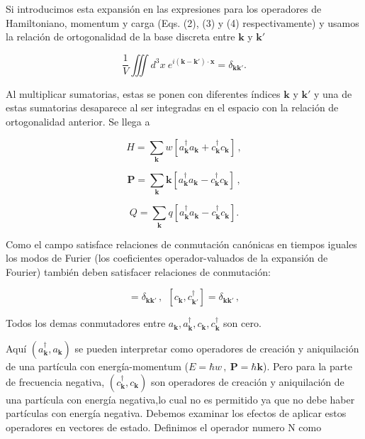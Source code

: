 \documentclass{article}
\begin{document}
Si introducimos esta expansión en las expresiones para los operadores de Hamiltoniano, momentum y carga (Eqs. (2), (3) y (4) respectivamente) y usamos la relación de ortogonalidad de la base discreta entre $\mathbf{k}$ y $\mathbf{k'}$

\begin{equation}
  \frac{1}{V}\iiint  d^3x \   e^{i(\mathbf{k}-\mathbf{k'}) \cdot \mathbf{x}}=\delta_{\mathbf{kk'}}.
\end{equation}

Al multiplicar sumatorias, estas se ponen con diferentes índices $\mathbf{k}$ y $\mathbf{k'}$ y una de estas sumatorias desaparece al ser integradas en el espacio con la relación de ortogonalidad anterior. Se llega a 

\begin{equation}
  H = \sum_{\mathbf{k}} w[a_{\mathbf{k}}^\dagger a_{\mathbf{k}} + c_{\mathbf{k}}^\dagger c_{\mathbf{k}} ]\,,
\end{equation}

\begin{equation}
  \mathbf{P} = \sum_{{\mathbf{k}}} \mathbf{k}[a_{\mathbf{k}}^\dagger a_{\mathbf{k}} - c_{\mathbf{k}}^\dagger c_{\mathbf{k}} ]\,,
\end{equation}

\begin{equation}
  Q = \sum_{{\mathbf{k}}} q[a_{\mathbf{k}}^\dagger a_{\mathbf{k}} - c_{\mathbf{k}}^\dagger c_{\mathbf{k}} ].
\end{equation}

Como el campo satisface  relaciones de conmutación canónicas en tiempos iguales los modos de Furier (los coeficientes operador-valuados de la expansión de Fourier) también deben satisfacer relaciones de conmutación:

\begin{equation}
  [a_{\mathbf{k}},a_{{\mathbf{k}}'}^\dagger] = \delta_{\mathbf{kk'}}\,, \ \  [c_{\mathbf{k}},c_{{\mathbf{k}}'}^\dagger] = \delta_{\mathbf{kk'}}\,, 
\end{equation}

Todos los demas conmutadores entre $a_{\mathbf{k}},a_{\mathbf{k}}^\dagger,c_{\mathbf{k}},c_{\mathbf{k}}^\dagger$ son cero. 

Aquí $(a_{\mathbf{k}}^\dagger, a_{\mathbf{k}})$ se pueden interpretar como operadores de creación y aniquilación de una partícula con energía-momentum ($E=\hbar w \,, \ \mathbf{P}=\hbar \mathbf{k} $). Pero para la parte de frecuencia negativa,   $(c_{\mathbf{k}}^\dagger, c_{\mathbf{k}})$ son operadores de creación y aniquilación de una partícula con energía negativa,lo cual no es permitido ya que no debe haber partículas con energía negativa. Debemos examinar los efectos de aplicar estos operadores en vectores de estado. Definimos el operador numero N como
\end{document}
